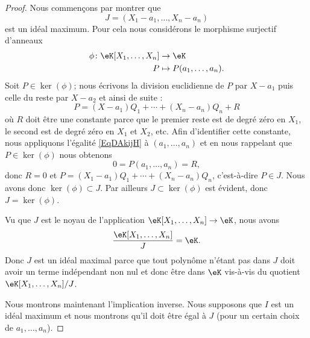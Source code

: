 \begin{proof}
	Nous commençons par montrer que
	\begin{equation}
		J=(X_1-a_1,\ldots, X_n-a_n)
	\end{equation}
	est un idéal maximum. Pour cela nous considérons le morphisme surjectif d'anneaux
	\begin{equation}
		\begin{aligned}
			\phi\colon \eK[X_1,\ldots, X_n] & \to \eK                     \\
			P                               & \mapsto P(a_1,\ldots, a_n).
		\end{aligned}
	\end{equation}
	Soit \( P\in\ker(\phi)\); nous écrivons la division euclidienne de \( P\) par \( X-a_1\) puis celle du reste par \( X-a_2\) et ainsi de suite :
	\begin{equation}    \label{EqDAkijH}
		P=(X-a_1)Q_1+\cdots +(X_n-a_n)Q_n+R
	\end{equation}
	où \( R\) doit être une constante parce que le premier reste est de degré zéro en \( X_1\), le second est de degré zéro en \( X_1\) et \( X_2\), etc. Afin d'identifier cette constante, nous appliquons l'égalité \eqref{EqDAkijH} à \( (a_1,\ldots, a_n)\) et en nous rappelant que \( P\in \ker(\phi)\) nous obtenons
	\begin{equation}
		0=P(a_1,\ldots, a_n)=R,
	\end{equation}
	donc \( R=0\) et \( P=(X_1-a_1)Q_1+\cdots +(X_n-a_n)Q_n\), c'est-à-dire \( P\in J\). Nous avons donc \( \ker(\phi)\subset J\). Par ailleurs \( J\subset \ker(\phi)\) est évident, donc \( J=\ker(\phi)\).

	Vu que \( J\) est le noyau de l'application \( \eK[X_1,\ldots, X_n]\to \eK\), nous avons
	\begin{equation}
		\frac{ \eK[X_1,\ldots, X_n] }{ J }=\eK.
	\end{equation}
	Donc \( J\) est un idéal maximal parce que tout polynôme n'étant pas dans \( J\) doit avoir un terme indépendant non nul et donc être dans \( \eK\) vis-à-vis du quotient \( \eK[X_1,\ldots, X_n]/J\).

	Nous montrons maintenant l'implication inverse. Nous supposons que \( I\) est un idéal maximum et nous montrons qu'il doit être égal à \( J\) (pour un certain choix de \( a_1,\ldots, a_n\)).


\end{proof}
